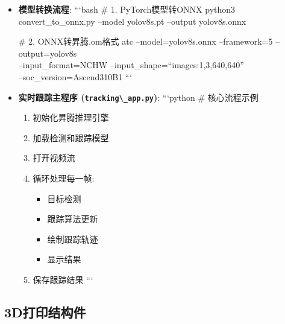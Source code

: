 \begin{itemize}
\item
  \textbf{模型转换流程}: ```bash \# 1. PyTorch模型转ONNX python3
  convert\_to\_onnx.py --model yolov8s.pt --output yolov8s.onnx

  \# 2. ONNX转昇腾.om格式 atc --model=yolov8s.onnx --framework=5
  --output=yolov8s\\
  --input\_format=NCHW --input\_shape=``images:1,3,640,640''\\
  --soc\_version=Ascend310B1 ```
\item
  \textbf{实时跟踪主程序 (\passthrough{\lstinline!tracking\_app.py!})}:
  ```python \# 核心流程示例

  \begin{enumerate}
  \def\labelenumi{\arabic{enumi}.}
  \tightlist
  \item
    初始化昇腾推理引擎
  \item
    加载检测和跟踪模型
  \item
    打开视频流
  \item
    循环处理每一帧:

    \begin{itemize}
    \tightlist
    \item
      目标检测
    \item
      跟踪算法更新
    \item
      绘制跟踪轨迹
    \item
      显示结果
    \end{itemize}
  \item
    保存跟踪结果 ```
  \end{enumerate}
\end{itemize}

\subsection{3D打印结构件}\label{dux6253ux5370ux7ed3ux6784ux4ef6}

